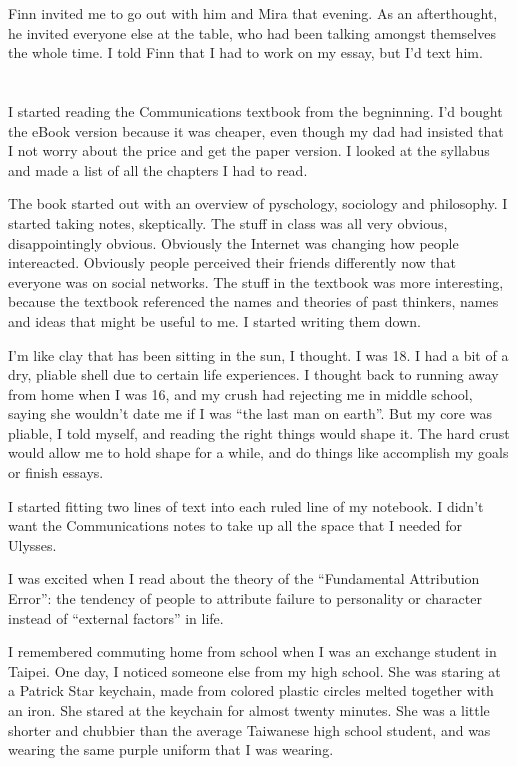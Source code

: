 Finn invited me to go out with him and Mira that evening.  As an afterthought,
he invited everyone else at the table, who had been talking amongst themselves
the whole time.  I told Finn that I had to work on my essay, but I'd text him.

\section{}

I started reading the Communications textbook from the begninning.  I'd bought
the eBook version because it was cheaper, even though my dad had insisted that I
not worry about the price and get the paper version.  I looked at the syllabus
and made a list of all the chapters I had to read.  

The book started out with an overview of pyschology, sociology and philosophy.
I started taking notes, skeptically.  The stuff in class was all very obvious,
disappointingly obvious.  Obviously the Internet was changing how people
intereacted.  Obviously people perceived their friends differently now that
everyone was on social networks.  The stuff in the textbook was more
interesting, because the textbook referenced the names and theories of past
thinkers, names and ideas that might be useful to me.  I started writing them
down. 

I'm like clay that has been sitting in the sun, I thought.  I was 18.  I had a
bit of a dry, pliable shell due to certain life experiences.  I thought back to
running away from home when I was 16, and my crush had rejecting me in middle
school, saying she wouldn't date me if I was ``the last man on earth''.  But my
core was pliable, I told myself, and reading the right things would shape it.
The hard crust  would allow me to hold shape for a while, and do things like
accomplish my goals or finish essays.

I started fitting two lines of text into each ruled line of my
notebook.  I didn't want the Communications notes to take up all the space that
I needed for Ulysses.  

I was excited when I read about the theory of the ``Fundamental Attribution
Error'': the tendency of people to attribute failure to personality or character
instead of ``external factors'' in life. 

I remembered commuting home from school when I was an exchange student in
Taipei.  One day, I noticed someone else from my high school.  She was staring
at a Patrick Star keychain, made from colored plastic circles melted together
with an iron.  She stared at the keychain for almost twenty minutes.  She was a
little shorter and chubbier than the average Taiwanese high school student, and
was wearing the same purple uniform that I was wearing.

